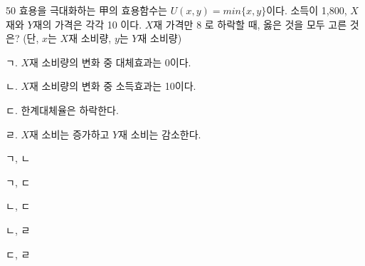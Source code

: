 \begin{question}{50}
효용을 극대화하는 甲의 효용함수는 $U(x,y)=min\{x,y\}$이다. 소득이 1,800, $X$재와 $Y$재의 가격은 각각 10 이다. $X$재 가격만 8 로 하락할 때, 옳은 것을 모두 고른 것은? (단, $x$는 $X$재 소비량, $y$는 $Y$재 소비량)
\begin{framedtext}
ㄱ. $X$재 소비량의 변화 중 대체효과는 0이다. \par
ㄴ. $X$재 소비량의 변화 중 소득효과는 10이다. \par
ㄷ. 한계대체율은 하락한다. \par
ㄹ. $X$재 소비는 증가하고 $Y$재 소비는 감소한다. \par
\end{framedtext}
\begin{choices}
  \item ㄱ, ㄴ
  \item ㄱ, ㄷ
  \item ㄴ, ㄷ
  \item ㄴ, ㄹ
  \item ㄷ, ㄹ
\end{choices}
\end{question}

